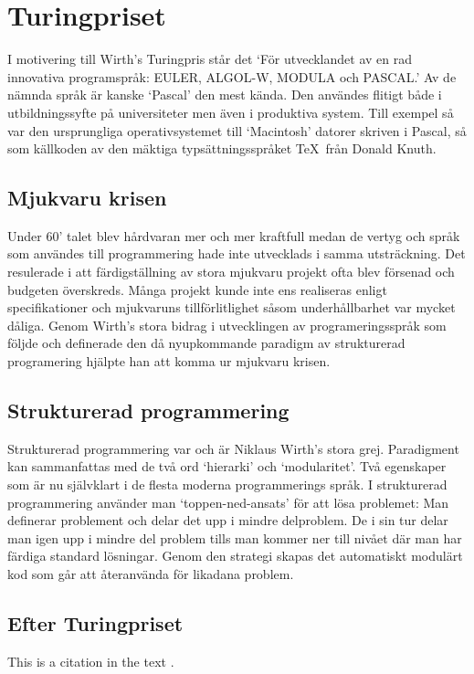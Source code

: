 \section{Turingpriset}
I motivering till Wirth's Turingpris står det `För utvecklandet av en rad 
innovativa programspråk: EULER, ALGOL-W, MODULA och PASCAL.' Av de nämnda språk 
är kanske `Pascal' den mest kända. Den användes flitigt både i utbildningssyfte 
på universiteter men även i produktiva system. Till exempel så var den ursprungliga
operativsystemet till `Macintosh' datorer skriven i Pascal, så som källkoden av
den mäktiga typsättningsspråket \TeX\ från Donald Knuth. 

\subsection{Mjukvaru krisen}
Under 60' talet blev hårdvaran mer och mer kraftfull medan de vertyg och språk som 
användes till programmering hade inte utvecklads i samma utsträckning. Det resulerade
i att färdigställning av stora mjukvaru projekt ofta blev försenad och budgeten
överskreds. Många projekt kunde inte ens realiseras enligt specifikationer 
och mjukvaruns tillförlitlighet såsom underhållbarhet var mycket
dåliga. Genom Wirth's stora bidrag i utvecklingen av programeringsspråk som följde
och definerade den då nyupkommande paradigm av strukturerad programering 
hjälpte han att komma ur mjukvaru krisen.

\subsection{Strukturerad programmering}
Strukturerad programmering var och är Niklaus Wirth's stora
grej. Paradigment kan sammanfattas med de två ord `hierarki' och
`modularitet'. Två egenskaper som är nu självklart i de flesta moderna
programmerings språk. I strukturerad programmering använder man
`toppen-ned-ansats'
för att lösa problemet: Man definerar problement och delar det upp i
mindre delproblem. De i sin tur delar man igen upp i mindre del
problem tills man kommer ner till nivået där man har färdiga standard
lösningar. Genom den strategi skapas det automatiskt modulärt kod
som går att återanvända för likadana problem.

\subsection{Efter Turingpriset}
This is a citation in the text \cite{Hudson-et-al1982}.
 

